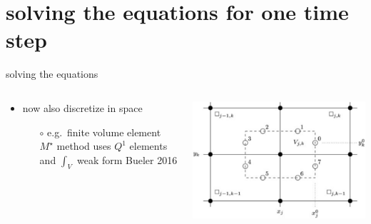 \documentclass[hide notes,intlimits,usenames,dvipsnames]{beamer}
\begin{document}
\section{solving the equations for one time step}

\begin{frame}{solving the equations}
\begin{columns}
\begin{column}{0.55\textwidth}
\begin{itemize}
\item now also discretize in space
    \begin{itemize}
    \item[$\circ$] e.g.~finite volume element $M^\star$ method uses $Q^1$ elements and $\int_V$ weak form \hfill \tiny  Bueler 2016
    \end{itemize}
\end{itemize}
\end{column}
\begin{column}{0.45\textwidth}
\bigskip

\includegraphics[width=\textwidth]{mstarstencil.png} 
\end{column}
\end{columns}


\end{frame}
\end{document}

